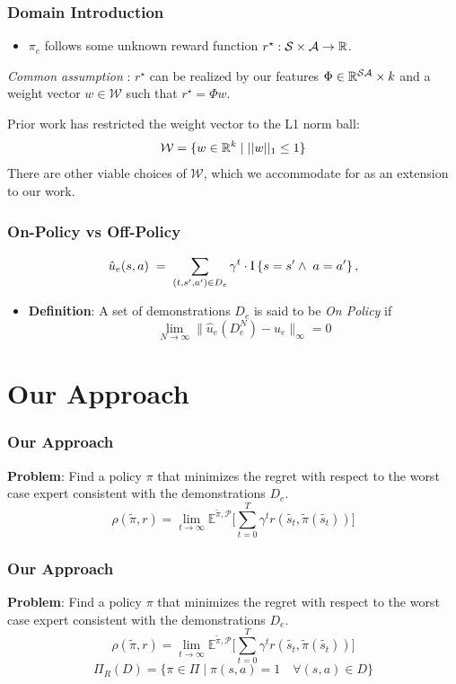 \documentclass{beamer}
\begin{document}
\begin{frame}
	\frametitle{Domain Introduction}
\begin{itemize}
	\item $\pi_e$ follows some unknown reward function $r^\star : \mathcal{S} \times \mathcal{A} \to \mathbb{R}$.
\end{itemize}
	\emph{Common assumption} : $r^\star$ can be realized by our features $\Phi \in \mathbb{R}^{\mathcal{S}\mathcal{A}} \times k$
	and a weight vector $w \in \mathcal{W}$ such that $r^\star = \Phi w$.

	Prior work has restricted the weight vector to the L1 norm ball:
	\[ \mathcal{W} = \lbrace w \in \mathbb{R}^k \mid \lvert \lvert w \rvert \rvert_1 \leq 1 \rbrace \]
	There are other viable choices of $\mathcal{W}$, which we accommodate for as an extension to our work.
\end{frame}

\begin{frame}
	\frametitle{On-Policy vs Off-Policy}
	\begin{equation*} \label{eq:definition_u_hat}
	\hat{u}_e(s,a)
	\;=\; \sum_{(t, s',a') \in D_e} \gamma^t \cdot  \operatorname{\rm I}\left\{ s=s' \wedge\; a=a' \right\},
	\end{equation*}
	\vfill
	\begin{itemize}
		\item \textbf{Definition}: A set of demonstrations $D_e$ is said to be \emph{On Policy} if $$\lim_{N \to \infty} \| \hat{u}_e(D_e^N) - u_e \|_\infty  = 0$$
	\end{itemize}
\end{frame}


\section*{Our Approach}

\begin{frame}
	\frametitle{Our Approach}
	\textbf{Problem}: Find a policy $\pi$ that minimizes the regret with respect to the worst case expert consistent with the demonstrations $D_e$.
	\[ \rho(\tilde{\pi}, r) = \lim_{t \to \infty} \mathbb{E}^{\tilde{\pi}, \mathcal{P}} \lbrack \sum_{t=0}^T \gamma^t r(\tilde{s_t}, \tilde{\pi}(\tilde{s_t})) \rbrack \]
\end{frame}

\begin{frame}
	\frametitle{Our Approach}
	\textbf{Problem}: Find a policy $\pi$ that minimizes the regret with respect to the worst case expert consistent with the demonstrations $D_e$.
	\[ \rho(\tilde{\pi}, r) = \lim_{t \to \infty} \mathbb{E}^{\tilde{\pi}, \mathcal{P}} \lbrack \sum_{t=0}^T \gamma^t r(\tilde{s_t}, \tilde{\pi}(\tilde{s_t})) \rbrack \]
	\[ \Pi_R(D) = \lbrace \pi \in \Pi \mid \pi(s,a) = 1 \quad \forall (s,a) \in D \rbrace \]
\end{frame}
\end{document}
